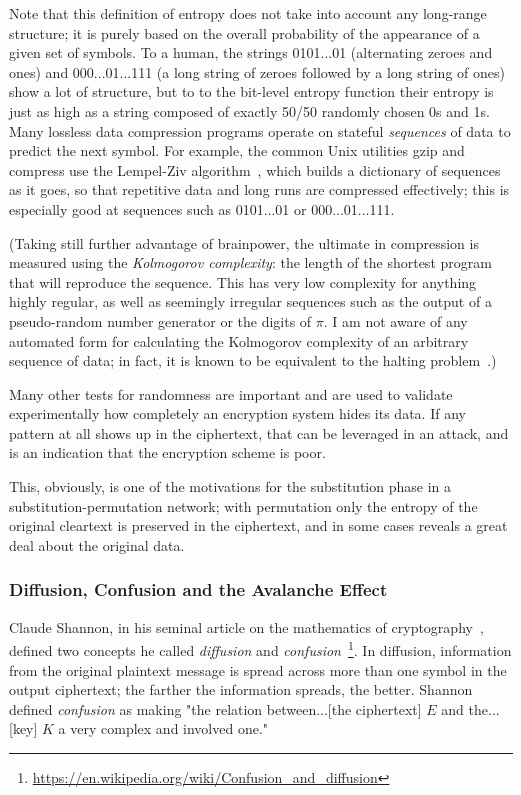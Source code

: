 Note that this definition of entropy does not take into account any
long-range structure; it is purely based on the overall probability of
the appearance of a given set of symbols.  To a human, the strings
0101...01 (alternating zeroes and ones) and 000...01...111 (a long
string of zeroes followed by a long string of ones) show a lot of
structure, but to to the bit-level entropy function their entropy is
just as high as a string composed of exactly 50/50 randomly chosen 0s
and 1s.
Many lossless data compression programs operate on stateful
\emph{sequences} of data to predict the next symbol.  For example, the
common Unix utilities gzip and compress use the Lempel-Ziv
algorithm~\cite{compression:Ziv78}, which builds a dictionary of
sequences as it goes, so that repetitive data and long runs are
compressed effectively; this is especially good at sequences such as
0101...01 or 000...01...111.

(Taking still further advantage of brainpower, the ultimate in
compression is measured using the \emph{Kolmogorov complexity}: the
length of the shortest program that will reproduce the sequence.  This
has very low complexity for anything highly regular, as well as
seemingly irregular sequences such as the output of a pseudo-random
number generator or the digits of $\pi$.  I am not aware of any
automated form for calculating the Kolmogorov complexity of an
arbitrary sequence of data; in fact, it is known to be equivalent to
the halting problem~\cite{chaitin1975theory,chaitin1995program}.)

Many other tests for randomness are important and are used to validate
experimentally how completely an encryption system hides its data.  If
any pattern at all shows up in the ciphertext, that can be leveraged
in an attack, and is an indication that the encryption scheme is
poor.

This, obviously, is one of the motivations for the substitution phase
in a substitution-permutation network; with permutation only the
entropy of the original cleartext is preserved in the ciphertext, and
in some cases reveals a great deal about the original data.

\subsubsection{Diffusion, Confusion and the Avalanche Effect}
\label{sec:diffusion}

Claude Shannon, in his seminal article on the mathematics of
cryptography~\cite{shannon45}, defined two concepts he called
\emph{diffusion} and \emph{confusion}~\footnote{\url{https://en.wikipedia.org/wiki/Confusion_and_diffusion}}.  In diffusion, information from
the original plaintext message is spread across more than one symbol
in the output ciphertext; the farther the information spreads, the
better.  Shannon defined \emph{confusion} as making "the relation
between...[the ciphertext] $E$ and the...[key] $K$ a very complex and
involved one."


